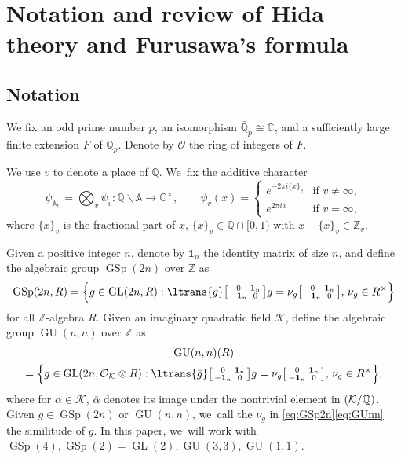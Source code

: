 \documentclass[JEP,XML,SOM,Unicode,published]{cedram}
\newcommand{\NoChangel}[1]{%
\expandafter\let\csname old\string#1\endcsname=#1
\let#1=\relax
\newcommand{#1}{\mathop{\mathcode`l="716C\csname old\string#1\endcsname\mathcode`l="7160}\displaylimits}%
}
\newenvironment{smallbmatrix}{\big[\begin{smallmatrix}}{\end{smallmatrix}\big]}
\theoremstyle{plain}
\theoremstyle{remark}
\newcommand{\bA}{\mathbb{A}}
\newcommand{\bC}{\mathbb{C}}
\newcommand{\bQ}{\mathbb{Q}}
\newcommand{\bZ}{\mathbb{Z}}
\newcommand{\cK}{\mathcal{K}}
\newcommand{\cO}{\mathcal{O}}
\DeclareMathOperator{\GL}{GL}
\DeclareMathOperator{\GSp}{GSp}
\DeclareMathOperator{\GU}{GU}
\DeclareMathOperator{\Gal}{Gal}\NoChangel{\Gal}
\newcommand{\bid}{\mathbf{1}}
\begin{document}
\section{Notation and review of Hida theory and Furusawa's formula}

\subsection{Notation}

We fix an odd prime number $p$, an isomorphism $\bar{\bQ}_p\cong\bC$, and a sufficiently large finite extension $F$ of $\bQ_p$. Denote by $\cO$ the ring of integers of $F$.

We use $v$ to denote a place of $\bQ$. We~fix the additive character
\[
\psi_{\bA_\bQ}=\bigotimes_v\psi_v:\bQ\backslash\bA\to\bC^\times,
\qquad \psi_v(x)=
\begin{cases}
e^{-2\pi i\{x\}_v}&\text{if } v\neq\infty,
\\e^{2\pi ix}&\text{if } v=\infty,
\end{cases}
\]
where $\{x\}_v$ is the fractional part of $x$, \ie $\{x\}_v\in\bQ\cap[0,1)$ with $x-\{x\}_v\in\bZ_v$.

Given a positive integer $n$, denote by $\bid_n$ the identity matrix of size $n$, and define the algebraic group $\GSp(2n)$ over $\bZ$ as
\begin{align}
\setlength{\arraycolsep}{2.5pt}
\label{eq:GSp2n}\GSp(2n,R)= \Bigl\{g\in\GL(2n,R):\ltrans{g}\begin{smallbmatrix}0&\bid_n\\-\bid_n&0\end{smallbmatrix}g=\nu_g\begin{smallbmatrix}0&\bid_n\\-\bid_n&0\end{smallbmatrix}, \,\nu_g\in R^\times \Bigr\}
\end{align}
for all $\bZ$-algebra $R$. Given an imaginary quadratic field $\cK$, define the algebraic group $\GU(n,n)$ over $\bZ$ as
\begin{multline}
\setlength{\arraycolsep}{2.5pt}
\label{eq:GUnn}\GU(n,n)(R)\\
=\Bigl\{g\in\GL(2n,\cO_\cK\otimes R):\ltrans{\bar{g}}\begin{smallbmatrix}0&\bid_n\\-\bid_n&0\end{smallbmatrix}g=\nu_g\begin{smallbmatrix}0&\bid_n\\-\bid_n&0\end{smallbmatrix}, \,\nu_g\in R^\times \Bigr\},
\end{multline}
where for $\alpha\in\cK$, $\bar{\alpha}$ denotes its image under the nontrivial element in $\Gal(\cK/\bQ)$. Given $g\in \GSp(2n)$ or $\GU(n,n)$, we~call the $\nu_g$ in \eqref{eq:GSp2n}\eqref{eq:GUnn} the similitude of $g$. In this paper, we~will work with $\GSp(4),\GSp(2)=\GL(2),\GU(3,3),\GU(1,1)$.
\end{document}

